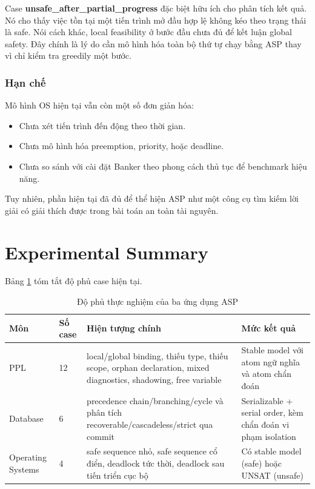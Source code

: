 ﻿\documentclass[11pt,a4paper]{article}
\begin{document}
Case \textbf{unsafe\_after\_partial\_progress} đặc biệt hữu ích cho phân tích kết quả. Nó cho thấy việc tồn tại một tiến trình mở đầu hợp lệ không kéo theo trạng thái là safe. Nói cách khác, local feasibility ở bước đầu chưa đủ để kết luận global safety. Đây chính là lý do cần mô hình hóa toàn bộ thứ tự chạy bằng ASP thay vì chỉ kiểm tra greedily một bước.

\subsubsection*{Hạn chế}
Mô hình OS hiện tại vẫn còn một số đơn giản hóa:
\begin{itemize}[leftmargin=1.5em]
  \item Chưa xét tiến trình đến động theo thời gian.
  \item Chưa mô hình hóa preemption, priority, hoặc deadline.
  \item Chưa so sánh với cài đặt Banker theo phong cách thủ tục để benchmark hiệu năng.
\end{itemize}
Tuy nhiên, phần hiện tại đã đủ để thể hiện ASP như một công cụ tìm kiếm lời giải có giải thích được trong bài toán an toàn tài nguyên.

\section{Experimental Summary}
Bảng \ref{tab:coverage} tóm tắt độ phủ case hiện tại.

\begin{table}[h]
\centering
\begin{tabular}{p{2.8cm} p{2.1cm} p{5.0cm} p{3.6cm}}
\toprule
Môn & Số case & Hiện tượng chính & Mức kết quả \\
\midrule
 PPL & 12 & local/global binding, thiếu type, thiếu scope, orphan declaration, mixed diagnostics, shadowing, free variable & Stable model với atom ngữ nghĩa và atom chẩn đoán \\
 Database & 6 & precedence chain/branching/cycle và phân tích recoverable/cascadeless/strict qua commit & Serializable + serial order, kèm chẩn đoán vi phạm isolation \\
 Operating Systems & 4 & safe sequence nhỏ, safe sequence cổ điển, deadlock tức thời, deadlock sau tiến triển cục bộ & Có stable model (safe) hoặc UNSAT (unsafe) \\
\bottomrule
\end{tabular}
\caption{Độ phủ thực nghiệm của ba ứng dụng ASP}
\label{tab:coverage}
\end{table}
\end{document}
